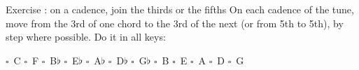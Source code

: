 \begin{study}{Exercise \theexercise: on a cadence, join the thirds or the fifths}
On each cadence of the tune, move from the 3rd of one chord to the 3rd of the next
(or from 5th to 5th), by step where possible. Do it in all keys:

\smallskip
\noindent
$\square$~C \quad $\square$~F \quad $\square$~B$\flat$ \quad $\square$~E$\flat$ \quad
$\square$~A$\flat$ \quad $\square$~D$\flat$ \quad $\square$~G$\flat$ \quad
$\square$~B \quad $\square$~E \quad $\square$~A \quad $\square$~D \quad $\square$~G
\end{study}
